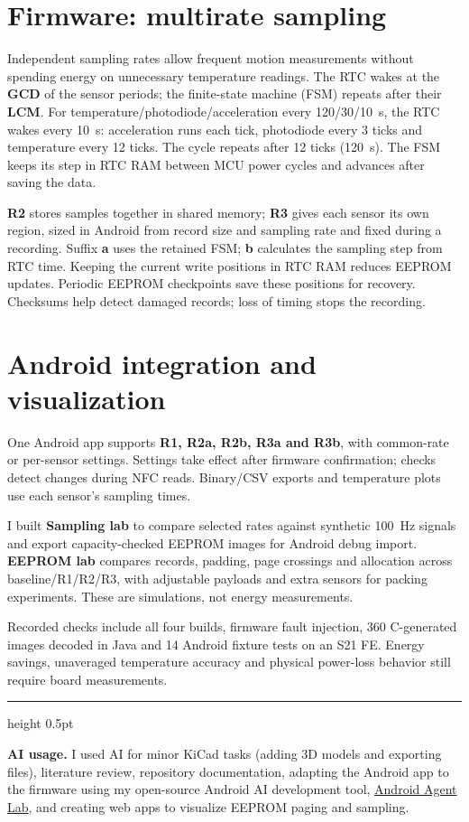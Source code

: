 \documentclass[a4paper]{article}
\begin{document}
\section*{Firmware: multirate sampling}
Independent sampling rates allow frequent motion measurements without spending
energy on unnecessary temperature readings. The RTC wakes at the
\textbf{GCD} of the sensor periods; the finite-state machine (FSM) repeats after
their \textbf{LCM}. For temperature/photodiode/acceleration every 120/30/10~s,
the RTC wakes every 10~s: acceleration runs each tick, photodiode every 3 ticks
and temperature every 12 ticks. The cycle repeats after 12 ticks (120~s).
The FSM keeps its step in RTC RAM between MCU power cycles and advances after saving
the data.

\textbf{R2} stores samples together in shared memory; \textbf{R3} gives each
sensor its own region, sized in Android from record size and sampling rate and
fixed during a recording. Suffix \textbf{a} uses the retained FSM; \textbf{b}
calculates the sampling step from RTC time. Keeping the current write positions
in RTC RAM reduces EEPROM updates. Periodic EEPROM checkpoints save these positions
for recovery. Checksums help detect damaged records;
loss of timing stops the recording.

\section*{Android integration and visualization}
One Android app supports \textbf{R1, R2a, R2b, R3a and R3b}, with common-rate or
per-sensor settings. Settings take effect after firmware confirmation; checks
detect changes during NFC reads. Binary/CSV exports and temperature plots use
each sensor's sampling times.

I built \textbf{Sampling lab} to compare selected rates
against synthetic 100~Hz signals and export capacity-checked EEPROM images for
Android debug import. \textbf{EEPROM lab} compares records, padding, page crossings
and allocation across baseline/R1/R2/R3, with adjustable payloads and extra sensors
for packing experiments. These are simulations, not energy measurements.

Recorded checks include all four builds, firmware fault injection, 360 C-generated
images decoded in Java and 14 Android fixture tests on an S21 FE. Energy savings,
unaveraged temperature accuracy and physical power-loss behavior still require
board measurements.

\par\vspace{5pt}
{\color{rulegray}\hrule height 0.5pt}
\vspace{4pt}
{\fontsize{8.5}{10.5}\selectfont\color{muted}\textbf{AI usage.} I used AI for minor KiCad tasks (adding 3D
models and exporting files), literature review, repository documentation,
adapting the Android app to the
firmware using my open-source Android AI development tool,
\href{https://github.com/hashimkarim/android-agent-lab}{Android Agent Lab}, and
creating web apps to visualize EEPROM paging and sampling.\par}
\end{document}
